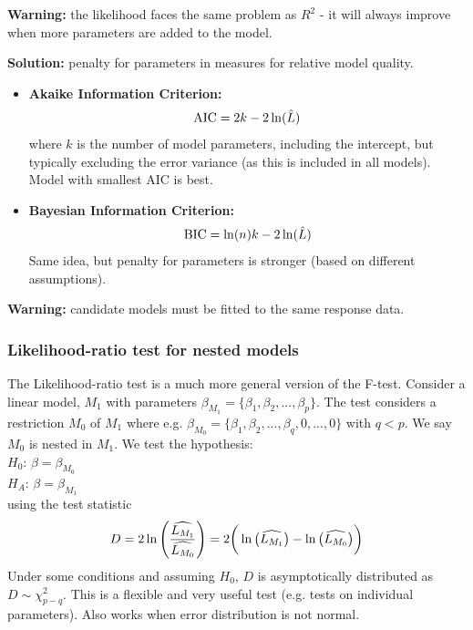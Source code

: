 \textbf{Warning:} the likelihood faces the same problem as $R^2$ - it will always improve when more parameters are added to the model.

\textbf{Solution:} penalty for parameters in measures for relative model quality.
\begin{itemize}
	\item \textbf{Akaike Information Criterion:}
	\begin{align}
		\text{AIC} = 2k-2\ln(\hat{L})\notag
	\end{align}
	where $k$ is the number of model parameters, including the intercept, but typically excluding the error variance (as this is included in all models). Model with smallest AIC is best.
	\item \textbf{Bayesian Information Criterion:}
	\begin{align}
		\text{BIC} = \ln(n)k - 2\ln(\hat{L})\notag
	\end{align}
	Same idea, but penalty for parameters is stronger (based on different assumptions).
\end{itemize}

\textbf{Warning:} candidate models must be fitted to the same response data.

\subsubsection{Likelihood-ratio test for nested models}

The Likelihood-ratio test is a much more general version of the F-test. Consider a linear model, $M_1$ with parameters $\beta_{M_1}=\{\beta_1,\beta_2,...,\beta_p\}$. The test considers a restriction $M_0$ of $M_1$ where e.g. $\beta_{M_0} = \{\beta_1,\beta_2,...,\beta_q,0,...,0\}$ with $q<p$. We say $M_0$ is nested in $M_1$. We test the hypothesis: \\
$H_0$: $\beta = \beta_{M_0}$ \\
$H_A$: $\beta = \beta_{M_1}$ \\
using the test statistic 
\begin{align}
	D = 2\ln\left(\frac{\widehat{L_{M_1}}}{\widehat{L_{M_0}}}\right) = 2\bigg(\ln\big(\widehat{L_{M_1}}\big) - \ln\big(\widehat{L_{M_0}}\big)\bigg) \notag
\end{align}
Under some conditions and assuming $H_0$, $D$ is asymptotically distributed as $D\sim\chi^2_{p-q}$. This is a flexible and very useful test (e.g. tests on individual parameters). Also works when error distribution is not normal.

